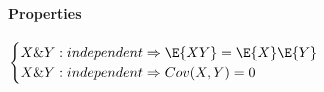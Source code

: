 \paragraph{Properties}
\begin{center}
	$\begin{cases}
	X\&Y: independent \Rightarrow \E{XY}=\E{X}\E{Y}\\
	X\&Y: independent \Rightarrow Cov(X,Y)=0
	\end{cases}$
\end{center}
